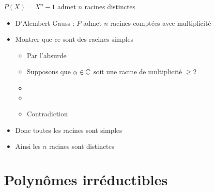 \begin{frame}
\begin{exemple}
$P(X)=X^n-1$ admet $n$ racines distinctes
\pause
\begin{itemize}
  \item D'Alembert-Gauss : $P$  admet $n$ racines comptées avec multiplicité
\pause
  \item Montrer que ce sont des racines simples
\pause
  \begin{itemize}
    \item Par l'absurde
\pause    
    \item Supposons que $\alpha \in \mathbb{C}$ soit une racine de multiplicité $\ge 2$
\pause
    \item {}  

    \item {}   
\pause \pause \pause \pause \pause \pause
    \item Contradiction
  \end{itemize}
\pause 
  \item Donc toutes les racines sont simples
\pause 
  \item Ainsi les $n$ racines sont distinctes
\end{itemize}
\end{exemple}


\end{frame}

\section{Polynômes irréductibles}

